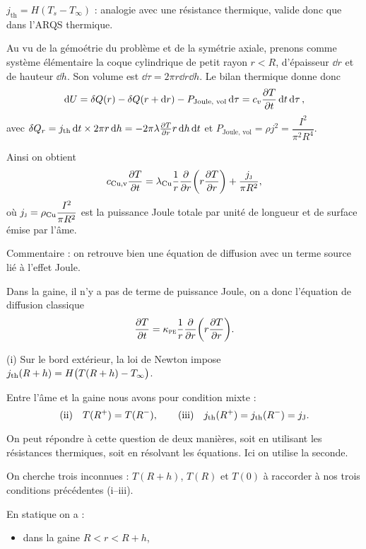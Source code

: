 \begin{solution}

\begin{questions}
    \questioncours $j_\text{th} = H(T_s - T_\infty)$ : analogie avec une résistance thermique, valide donc que dans l'ARQS thermique.
    
    \question Au vu de la gémoétrie du problème et de la symétrie axiale, prenons comme système élémentaire la coque cylindrique de petit rayon $r < R$, d'épaisseur $\dd{r}$ et de hauteur $\dd{h}$. Son volume est $\dd{\tau} = 2\pi r \dd{r}\dd{h}$. Le bilan thermique donne donc
    $$\dd{U} = \delta Q(r) - \delta Q(r+\dd{r}) - P_{\text{Joule, vol}}\dd{\tau} = c_v \pdv{T}{t}\dd{t}\dd{\tau},$$
    avec
    $\delta Q_r = j_\text{th} \dd{t} \times 2\pi r \dd{h} = -2\pi\lambda \pdv{T}{r}  r \dd{h}\dd{t}$ et $P_{\text{Joule, vol}} = \rho j^2 = \dfrac{I^2}{\pi^2 R^4}$.
    
    Ainsi on obtient
    $$c_\text{Cu,v}\pdv{T}{t} = \lambda_\text{Cu} \dfrac{1}{r}\pdv{r}\qty(r\pdv{T}{r}) + \dfrac{j_\textsc{j}}{\pi R^2},$$
    où $j_\textsc{j} = \rho_\text{Cu} \dfrac{I^2}{\pi R^2}$ est la puissance Joule totale par unité de longueur et de surface émise par l'âme.
    
    Commentaire : on retrouve bien une équation de diffusion avec un terme source lié à l'effet Joule.
    
    \question Dans la gaine, il n'y a pas de terme de puissance Joule, on a donc l'équation de diffusion classique
    $$\pdv{T}{t} = \kappa_\textsc{pe} \dfrac{1}{r}\pdv{r}\qty(r\pdv{T}{r}).$$
    
    \question (i) Sur le bord extérieur, la loi de Newton impose $j_\text{th}(R+h) = H\qty\big(T(R+h) - T_\infty)$.
    
    Entre l'âme et la gaine nous avons pour condition mixte :
    $$\text{(ii)\quad} T(R^+) = T(R^-), \qquad \text{(iii)\quad } j_\text{th}(R^+) = j_\text{th}(R^-) = j_\textsc{J}.$$
    
    \question On peut répondre à cette question de deux manières, soit en utilisant les résistances thermiques, soit en résolvant les équations. Ici on utilise la seconde.
    
    On cherche trois inconnues : $T(R+h)$, $T(R)$ et $T(0)$ à raccorder à nos trois conditions précédentes (i--iii).
    
    En statique on a :
    \begin{itemize}
        \item dans la gaine $R < r < R + h$,
        

\end{itemize}
\end{questions}
\end{solution}
